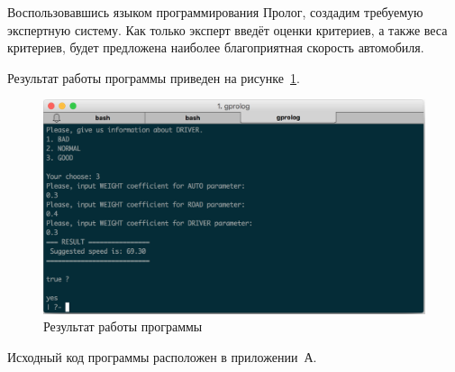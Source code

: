 \newpage

Воспользовавшись языком программирования Пролог, создадим
требуемую экспертную систему. Как только эксперт введёт
оценки критериев, а также веса критериев, будет предложена
наиболее благоприятная скорость автомобиля.

Результат работы программы приведен на рисунке~\ref{fig:results}.

\begin{figure}[h!]
  \centering
  \includegraphics[width=130mm]{img/results}
  \caption{Результат работы программы}
  \label{fig:results}
\end{figure}

Исходный код программы расположен в приложении~А.

\newpage